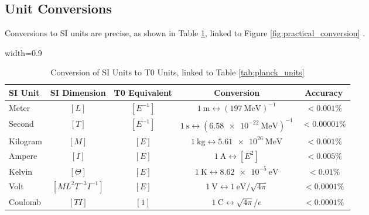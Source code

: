 \documentclass[12pt,a4paper]{article}
\newcommand{\tablescale}{0.9}
\begin{document}
	\subsection{Unit Conversions}
	\label{sec:conversions}
	
	Conversions to SI units are precise, as shown in Table \ref{tab:conversion}, linked to Figure \ref{fig:practical_conversion} \cite{pascher_temp_2025}.
	
	\begin{table}[htbp]
		\centering
		\begin{adjustbox}{width=\tablescale\textwidth}
			\begin{tabular}{lcccc}
				\toprule
				\textbf{SI Unit} & \textbf{SI Dimension} & \textbf{T0 Equivalent} & \textbf{Conversion} & \textbf{Accuracy} \\
				\midrule
				Meter & \([L]\) & \([E^{-1}]\) & \(\SI{1}{\meter} \leftrightarrow (\SI{197}{\mega\electronvolt})^{-1}\) & \(< 0.001\%\) \\
				Second & \([T]\) & \([E^{-1}]\) & \(\SI{1}{\second} \leftrightarrow (\SI{6.58e-22}{\mega\electronvolt})^{-1}\) & \(< 0.00001\%\) \\
				Kilogram & \([M]\) & \([E]\) & \(\SI{1}{\kilogram} \leftrightarrow \SI{5.61e26}{\mega\electronvolt}\) & \(< 0.001\%\) \\
				Ampere & \([I]\) & \([E]\) & \(\SI{1}{\ampere} \leftrightarrow [E^2]\) & \(< 0.005\%\) \\
				Kelvin & \([\Theta]\) & \([E]\) & \(\SI{1}{\kelvin} \leftrightarrow \SI{8.62e-5}{\electronvolt}\) & \(< 0.01\%\) \\
				Volt & \([ML^2 T^{-3} I^{-1}]\) & \([E]\) & \(\SI{1}{\volt} \leftrightarrow \SI{1}{\electronvolt}/\sqrt{4\pi}\) & \(< 0.0001\%\) \\
				Coulomb & \([T I]\) & \([1]\) & \(\SI{1}{\coulomb} \leftrightarrow \sqrt{4\pi}/e\) & \(< 0.0001\%\) \\
				\bottomrule
			\end{tabular}
		\end{adjustbox}
		\caption{Conversion of SI Units to T0 Units, linked to Table \ref{tab:planck_units}}
		\label{tab:conversion}
	\end{table}
	
\end{document}
